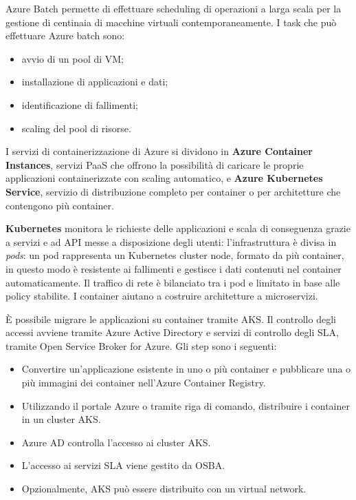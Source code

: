 \vspace{5mm}

Azure Batch permette di effettuare scheduling di operazioni a larga scala per la gestione di centinaia di macchine virtuali contemporaneamente. I task che può effettuare Azure batch sono:
\begin{itemize}
    \item avvio di un pool di VM;
    \item installazione di applicazioni e dati;
    \item identificazione di fallimenti;
    \item scaling del pool di risorse.
\end{itemize}
I servizi di containerizzazione di Azure si dividono in \textbf{Azure Container Instances}, servizi PaaS che offrono la possibilità di caricare le proprie applicazioni containerizzate con scaling automatico, e \textbf{Azure Kubernetes Service}, servizio di distribuzione completo per container o per architetture che contengono più container.

\textbf{Kubernetes} monitora le richieste delle applicazioni e scala di conseguenza grazie a servizi e ad API messe a disposizione degli utenti: l'infrastruttura è divisa in \textit{pods}: un pod rappresenta un Kubernetes cluster node, formato da più container, in questo modo è resistente ai fallimenti e gestisce i dati contenuti nel container automaticamente. Il traffico di rete è bilanciato tra i pod e limitato in base alle policy stabilite. I container aiutano a costruire architetture a microservizi.

È possibile migrare le applicazioni su container tramite AKS. Il controllo degli accessi avviene tramite Azure Active Directory e servizi di controllo degli SLA, tramite Open Service Broker for Azure. Gli step sono i seguenti:
\begin{itemize}
    \item Convertire un'applicazione esistente in uno o più container e pubblicare una o più immagini dei container nell'Azure Container Registry.
    \item Utilizzando il portale Azure o tramite riga di comando, distribuire i container in un cluster AKS.
    \item Azure AD controlla l'accesso ai cluster AKS.
    \item L'accesso ai servizi SLA viene gestito da OSBA.
    \item Opzionalmente, AKS può essere distribuito con un virtual network.
\end{itemize}


